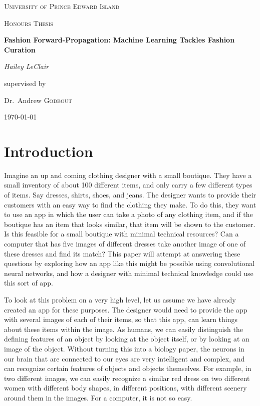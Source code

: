 \documentclass[12pt]{report} %
\begin{document}
\begin{titlepage}
\centering
    {\scshape\LARGE University of Prince Edward Island\par}
    \vspace{1cm}
    {\scshape\Large Honours Thesis\par}
    \vspace{1.5cm}
    {\huge\bfseries Fashion Forward-Propagation: Machine Learning Tackles Fashion Curation\par}
    \vspace{2cm}
    {\Large\itshape Hailey LeClair\par}
    \vfill
    supervised by\par
    Dr.~Andrew \textsc{Godbout}

\vfill

\today\par

\end{titlepage}
\tableofcontents
\newpage
\listoffigures
\newpage


\chapter{Introduction}
	Imagine an up and coming clothing designer with a small boutique. They have a small inventory of about 100 different items, and only carry a few different types of items. Say dresses, shirts, shoes, and jeans. The designer wants to provide their customers with an easy way to find the clothing they make. To do this, they want to use an app in which the user can take a photo of any clothing item, and if the boutique has an item that looks similar, that item will be shown to the customer. Is this feasible for a small boutique with minimal technical resources? Can a computer that has five images of different dresses take another image of one of these dresses and find its match? This paper will attempt at answering these questions by exploring how an app like this might be possible using convolutional neural networks, and how a designer with minimal technical knowledge could use this sort of app.
	
	To look at this problem on a very high level, let us assume we have already created an app for these purposes. The designer would need to provide the app with several images of each of their items, so that this app, can learn things about these items within the image. As humans, we can easily distinguish the defining features of an object by looking at the object itself, or by looking at an image of the object. Without turning this into a biology paper, the neurons in our brain that are connected to our eyes are very intelligent and complex, and can recognize certain features of objects and objects themselves\cite{aurelienMachineLearning}. For example, in two different images, we can easily recognize a similar red dress on two different women with different body shapes, in different positions, with different scenery around them in the images. For a computer, it is not so easy. 
	
\end{document}

